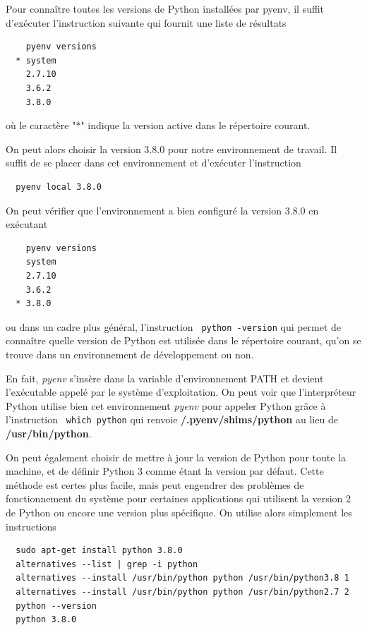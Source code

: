 \documentclass[twoside,a4paper,11pt,frenchb,openany]{report}
\begin{document}
Pour connaître toutes les versions de Python installées par pyenv, il suffit d'exécuter l'instruction suivante qui fournit une liste de résultats
\begin{verbatim}    pyenv versions
  * system
    2.7.10
    3.6.2
    3.8.0\end{verbatim}
où le caractère "*" indique la version active dans le répertoire courant.

On peut alors choisir la version 3.8.0 pour notre environnement de travail. Il suffit de se placer dans cet environnement et d'exécuter l'instruction
\begin{verbatim}  pyenv local 3.8.0\end{verbatim}

On peut vérifier que l'environnement a bien configuré la version 3.8.0 en exécutant

\begin{verbatim}    pyenv versions
    system
    2.7.10
    3.6.2
  * 3.8.0\end{verbatim}

ou dans un cadre plus général, l'instruction
\texttt{  python \textemdash-version} qui
permet de connaître quelle version de Python est utilisée dans le répertoire courant, qu'on se trouve dans un environnement de développement ou non.

En fait, \textit{pyenv} s'insère dans la variable d'environnement PATH et devient l'exécutable appelé par le système d'exploitation. On peut voir que l'interpréteur Python utilise bien cet environnement \textit{pyenv} pour appeler Python grâce à l'instruction
\texttt{   which python}
qui renvoie \textbf{\raisebox{-1ex}{\textasciitilde}/.pyenv/shims/python} au lieu de \textbf{/usr/bin/python}.

On peut également choisir de mettre à jour la version de Python pour toute la machine, et de définir Python 3 comme étant la version par défaut. Cette méthode est certes plus facile, mais peut engendrer des problèmes de fonctionnement du système pour certaines applications qui utilisent la version 2 de Python ou encore une version plus spécifique. On utilise alors simplement les instructions

\begin{verbatim}
  sudo apt-get install python 3.8.0
  alternatives --list | grep -i python
  alternatives --install /usr/bin/python python /usr/bin/python3.8 1
  alternatives --install /usr/bin/python python /usr/bin/python2.7 2
  python --version
  python 3.8.0
\end{verbatim}
\end{document}
